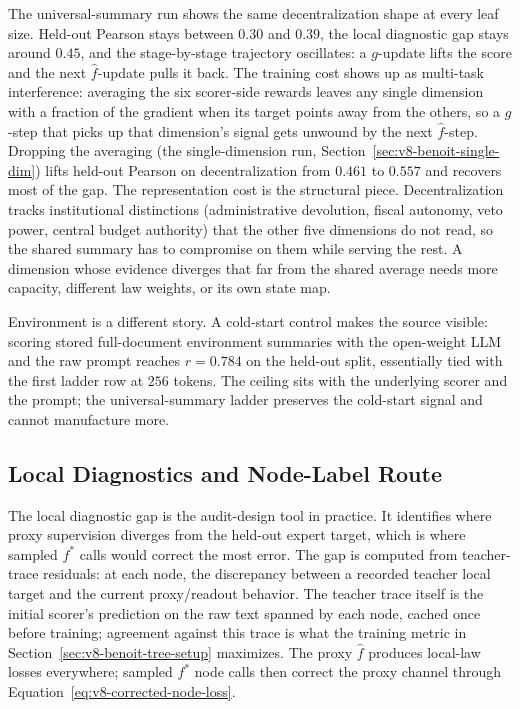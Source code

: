 The universal-summary run shows the same decentralization shape at
every leaf size. Held-out Pearson stays between \(0.30\) and
\(0.39\), the local diagnostic gap stays around \(0.45\), and the
stage-by-stage trajectory oscillates: a \(g\)-update lifts the
score and the next \(\widehat f\)-update pulls it back. The
training cost shows up as multi-task interference: averaging the
six scorer-side rewards leaves any single dimension with a fraction
of the gradient when its target points away from the others, so a
\(g\)-step that picks up that dimension's signal gets unwound by
the next \(\widehat f\)-step. Dropping the averaging (the
single-dimension run, Section~\ref{sec:v8-benoit-single-dim}) lifts
held-out Pearson on decentralization from \(0.461\) to \(0.557\)
and recovers most of the gap. The representation cost is the
structural piece. Decentralization tracks institutional
distinctions (administrative devolution, fiscal autonomy, veto
power, central budget authority) that the other five dimensions do
not read, so the shared summary has to compromise on them while
serving the rest. A dimension whose evidence diverges that far from
the shared average needs more capacity, different law weights, or
its own state map.

Environment is a different story. A cold-start control makes the
source visible: scoring stored full-document environment summaries
with the open-weight LLM and the raw \citet{BenoitEtAl2025} prompt reaches
\(r=0.784\) on the held-out split, essentially tied with the first
ladder row at \(256\) tokens. The ceiling sits with the underlying
scorer and the prompt; the universal-summary ladder preserves the
cold-start signal and cannot manufacture more.

\subsection{Local Diagnostics and Node-Label Route}
\label{sec:v8-benoit-local-diagnostics}

The local diagnostic gap is the audit-design tool in practice. It
identifies where proxy supervision diverges from the held-out
expert target, which is where sampled \(f^\ast\) calls would
correct the most error. The gap is computed from teacher-trace
residuals: at each node, the discrepancy between a recorded teacher
local target and the current proxy/readout behavior. The teacher
trace itself is the initial scorer's prediction on the raw text
spanned by each node, cached once before training; agreement
against this trace is what the training metric in
Section~\ref{sec:v8-benoit-tree-setup} maximizes. The proxy
\(\widehat f\) produces local-law losses everywhere; sampled
\(f^\ast\) node calls then correct the proxy channel through
Equation~\eqref{eq:v8-corrected-node-loss}.

